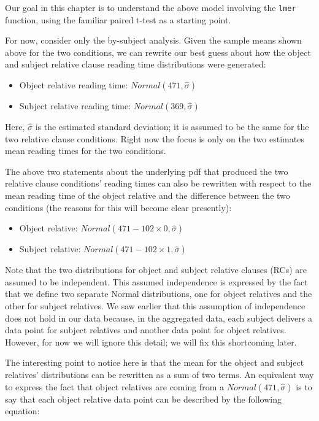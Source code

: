 \documentclass[
  12pt,
]{krantz}
\providecommand{\tightlist}{%
  \setlength{\itemsep}{0pt}\setlength{\parskip}{0pt}}
\theoremstyle{definition}
\theoremstyle{definition}
\theoremstyle{definition}
\theoremstyle{definition}
\theoremstyle{remark}
\begin{document}
Our goal in this chapter is to understand the above model involving the \texttt{lmer} function, using the familiar paired t-test as a starting point.

For now, consider only the by-subject analysis.
Given the sample means shown above for the two conditions,
we can rewrite our best guess about how the object and subject relative clause reading time distributions were generated:

\begin{itemize}
\tightlist
\item
  Object relative reading time: \(Normal(471,\hat\sigma)\)
\item
  Subject relative reading time: \(Normal(369,\hat\sigma)\)
\end{itemize}

Here, \(\hat\sigma\) is the estimated standard deviation; it is assumed to be the same for the two relative clause conditions. Right now the focus is only on the two estimates mean reading times for the two conditions.

The above two statements about the underlying pdf that produced the two relative clause conditions' reading times can also be rewritten with respect to the mean reading time of the object relative and the difference between the two conditions (the reasons for this will become clear presently):

\begin{itemize}
\tightlist
\item
  Object relative: \(Normal(471-102\times 0,\hat\sigma)\)
\item
  Subject relative: \(Normal(471-102\times 1,\hat\sigma)\)
\end{itemize}

Note that the two distributions for object and subject relative clauses (RCs) are assumed to be independent. This assumed independence is expressed by the fact that we define two separate Normal distributions, one for object relatives and the other for subject relatives. We saw earlier that this assumption of independence does not hold in our data because, in the aggregated data, each subject delivers a data point for subject relatives and another data point for object relatives. However, for now we will ignore this detail; we will fix this shortcoming later.

The interesting point to notice here is that the mean for the object and subject relatives' distributions can be rewritten as a sum of two terms. An equivalent way to express the fact that object relatives are coming from a \(Normal(471,\hat\sigma)\) is to say that each object relative data point can be described by the following equation:
\end{document}
